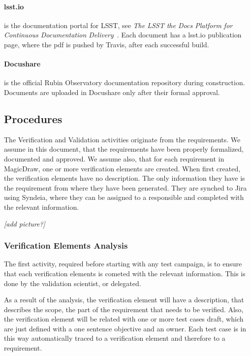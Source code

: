 \paragraph{lsst.io}
is the documentation portal for LSST, see \textit{The LSST the Docs Platform for Continuous Documentation Delivery}\cite{SQR-006}~.
Each document has a lsst.io publication page, where the pdf is pushed by Travis, after each successful build.

\paragraph{Docushare}
is the official Rubin Observatory documentation repository during construction.
Documents are uploaded in Docushare only after their formal approval.


\subsection{Procedures}

The Verification and Validation activities originate from the requirements.
We assume in this document, that the requirements have been properly formalized, documented and approved.
We assume also, that for each requirement in MagicDraw, one or more verification elements are created.
When first created, the verification elements have no description. The only information they have is the requirement from where they have been generated.
They are synched to Jira using Syndeia, where they can be assigned to a responsible and completed with the relevant information.

\textit{[add picture?]}


\subsubsection{Verification Elements Analysis}

The first activity, required before starting with any test campaign, is to ensure that each verification elements is cometed with the relevant information.
This is done by the validation scientist, or delegated.

As a result of the analysis, the verification element will have a description, that describes the scope, the part of the requirement that needs to be verified.
Also, the verification element will be related with one or more test cases draft, which are just defined with a one sentence objective and an owner.
Each test case is in this way automatically traced to a verification element and therefore to a requirement.

